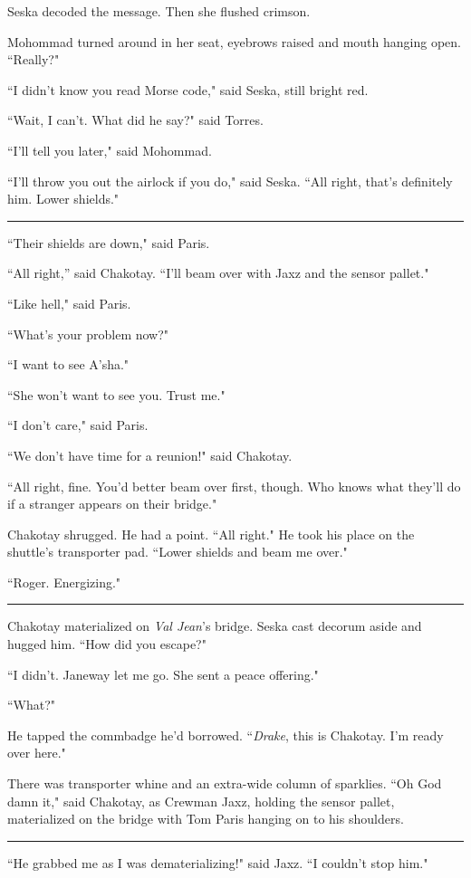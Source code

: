 \documentclass[twoside,letterpaper,12pt]{memoir}
\begin{document}
Seska decoded the message. Then she flushed crimson.

Mohommad turned around in her seat, eyebrows raised and mouth hanging open. ``Really?"

``I didn't know you read Morse code," said Seska, still bright red.

``Wait, I can't. What did he say?" said Torres.

``I'll tell you later," said Mohommad.

``I'll throw you out the airlock if you do," said Seska. ``All right, that’s definitely him. Lower shields."

\fancybreak{\rule{3cm}{0.4 pt}}
``Their shields are down," said Paris.

``All right,” said Chakotay. ``I'll beam over with Jaxz and the sensor pallet."

``Like hell," said Paris.

``What's your problem now?"

``I want to see A'sha."

``She won't want to see you. Trust me."

``I don't care," said Paris.

``We don't have time for a reunion!" said Chakotay.

``All right, fine. You'd better beam over first, though. Who knows what they'll do if a stranger appears on their bridge."

Chakotay shrugged. He had a point. ``All right." He took his place on the shuttle's transporter pad. ``Lower shields and beam me over."

``Roger. Energizing."

\fancybreak{\rule{3cm}{0.4 pt}}
Chakotay materialized on \textit{Val Jean}'s bridge. Seska cast decorum aside and hugged him. ``How did you escape?"

``I didn't. Janeway let me go. She sent a peace offering."

``What?"

He tapped the commbadge he'd borrowed. ``\textit{Drake}, this is Chakotay. I'm ready over here."

There was transporter whine and an extra-wide column of sparklies. ``Oh God damn it," said Chakotay, as Crewman Jaxz, holding the sensor pallet, materialized on the bridge with Tom Paris hanging on to his shoulders.

\fancybreak{\rule{3cm}{0.4 pt}}
``He grabbed me as I was dematerializing!" said Jaxz. ``I couldn't stop him."
\end{document}
